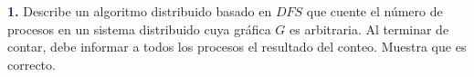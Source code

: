 \newpage
\textbf{\textcolor{MidnightBlue}{1.}}
Describe un algoritmo distribuido basado en $DFS$ que cuente el número de procesos
en un sistema distribuido cuya gráfica $G$ es arbitraria. Al terminar de contar, debe informar a todos
los procesos el resultado del conteo. Muestra que es correcto.